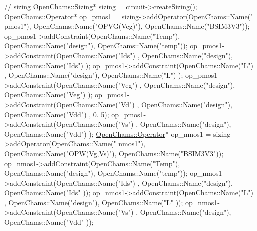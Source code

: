 \begin{DoxyCodeInclude}
    \textcolor{comment}{// sizing}
    \hyperlink{class_open_chams_1_1_sizing}{OpenChams::Sizing}* sizing = circuit->createSizing();
    \hyperlink{class_open_chams_1_1_operator}{OpenChams::Operator}* op\_pmos1 = sizing->\hyperlink{class_open_chams_1_1_sizing_a712e045c11e463cff8411b3d0fd7f732}{addOperator}(OpenChams::Name(\textcolor{stringliteral}{"
      pmos1"}), OpenChams::Name(\textcolor{stringliteral}{"OPVG(Veg)"}), OpenChams::Name(\textcolor{stringliteral}{"BSIM3V3"}));
    op\_pmos1->addConstraint(OpenChams::Name(\textcolor{stringliteral}{"Temp"}), OpenChams::Name(\textcolor{stringliteral}{"design"}), OpenChams::Name(\textcolor{stringliteral}{"temp"}));
    op\_pmos1->addConstraint(OpenChams::Name(\textcolor{stringliteral}{"Ids"}) , OpenChams::Name(\textcolor{stringliteral}{"design"}), OpenChams::Name(\textcolor{stringliteral}{"Ids"}) );
    op\_pmos1->addConstraint(OpenChams::Name(\textcolor{stringliteral}{"L"})   , OpenChams::Name(\textcolor{stringliteral}{"design"}), OpenChams::Name(\textcolor{stringliteral}{"L"})   );
    op\_pmos1->addConstraint(OpenChams::Name(\textcolor{stringliteral}{"Veg"}) , OpenChams::Name(\textcolor{stringliteral}{"design"}), OpenChams::Name(\textcolor{stringliteral}{"Veg"}) );
    op\_pmos1->addConstraint(OpenChams::Name(\textcolor{stringliteral}{"Vd"})  , OpenChams::Name(\textcolor{stringliteral}{"design"}), OpenChams::Name(\textcolor{stringliteral}{"Vdd"}) , 0.
      5);
    op\_pmos1->addConstraint(OpenChams::Name(\textcolor{stringliteral}{"Vs"})  , OpenChams::Name(\textcolor{stringliteral}{"design"}), OpenChams::Name(\textcolor{stringliteral}{"Vdd"}) );
    \hyperlink{class_open_chams_1_1_operator}{OpenChams::Operator}* op\_nmos1 = sizing->\hyperlink{class_open_chams_1_1_sizing_a712e045c11e463cff8411b3d0fd7f732}{addOperator}(OpenChams::Name(\textcolor{stringliteral}{"
      nmos1"}), OpenChams::Name(\textcolor{stringliteral}{"OPW(Vg,Vs)"}), OpenChams::Name(\textcolor{stringliteral}{"BSIM3V3"}));
    op\_nmos1->addConstraint(OpenChams::Name(\textcolor{stringliteral}{"Temp"}), OpenChams::Name(\textcolor{stringliteral}{"design"}), OpenChams::Name(\textcolor{stringliteral}{"temp"}));
    op\_nmos1->addConstraint(OpenChams::Name(\textcolor{stringliteral}{"Ids"}) , OpenChams::Name(\textcolor{stringliteral}{"design"}), OpenChams::Name(\textcolor{stringliteral}{"Ids"} ));
    op\_nmos1->addConstraint(OpenChams::Name(\textcolor{stringliteral}{"L"})   , OpenChams::Name(\textcolor{stringliteral}{"design"}), OpenChams::Name(\textcolor{stringliteral}{"L"}   ));
    op\_nmos1->addConstraint(OpenChams::Name(\textcolor{stringliteral}{"Vs"})  , OpenChams::Name(\textcolor{stringliteral}{"design"}), OpenChams::Name(\textcolor{stringliteral}{"Vdd"} ));

\end{DoxyCodeInclude}
